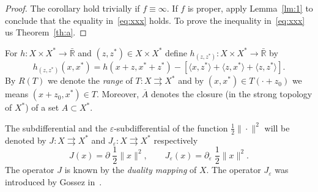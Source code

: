 \documentclass[11pt]{article}
\newcommand{\BR}{\bar{\mathbb{R}}}
\newcommand{\inner}[2]{\langle{#1},{#2}\rangle}
\newcommand{\tos}{\rightrightarrows} %
\begin{document}
\begin{proof}
  The corollary hold trivially if $f\equiv \infty$. If $f$ is proper,
  apply Lemma~\ref{lm:1} to conclude that the equality
  in~\eqref{eq:xxx} holds. To prove the inequality in~\eqref{eq:xxx}
  us Theorem~\ref{th:a}.
\end{proof}






For $h:X\times X^*\to \BR$ and $(z,z^*)\in X\times X^*$ define
$h_{(z,z^*)}:X\times X^*\to \BR$ by~\cite{leg.sva-mon.sva05,alv.sva-new.jca09}
\[
 h_{(z,z^*)}(x,x^*)=h(x+z,x^*+z^*)-[\inner{x}{z^*}+\inner{z}{x^*}+\inner{z}{z^*}].
\]
%
By $R(T)$ we denote the {\it range} of $T:X\tos X^*$ and by
$(x,x^*)\in T(\cdot +z_0)$ we means $(x+z_0,x^*)\in T$. Moreover,
$\overline A$ denotes the closure (in the strong topology of $X^*$) of
a set $A\subset X^*$.
%

The subdifferential and the $\varepsilon$-subdifferential of the
function $\frac{1}{2}\|\cdot\|^2$ will be denoted by $J:X\tos X^*$ and
$J_\varepsilon:X\tos X^*$ respectively
\[
J(x)=\partial\; \frac{1}{2}\|x\|^2,\qquad J_\varepsilon
(x)=\partial_\varepsilon\; \frac{1}{2}\|x\|^2.
\]
The operator $J$ is known by the {\it duality mapping} of $X$. The operator
$J_{\varepsilon}$ was introduced by Gossez in~\cite{gos-ope.jmaa71}.
\end{document}

